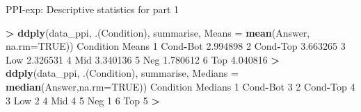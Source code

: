 \documentclass[ignorenonframetext,]{beamer}
\newenvironment{Shaded}{\begin{snugshade}}{\end{snugshade}}
\newcommand{\KeywordTok}[1]{\textcolor[rgb]{0.13,0.29,0.53}{\textbf{#1}}}
\newcommand{\DataTypeTok}[1]{\textcolor[rgb]{0.13,0.29,0.53}{#1}}
\newcommand{\DecValTok}[1]{\textcolor[rgb]{0.00,0.00,0.81}{#1}}
\newcommand{\FloatTok}[1]{\textcolor[rgb]{0.00,0.00,0.81}{#1}}
\newcommand{\StringTok}[1]{\textcolor[rgb]{0.31,0.60,0.02}{#1}}
\newcommand{\OtherTok}[1]{\textcolor[rgb]{0.56,0.35,0.01}{#1}}
\newcommand{\OperatorTok}[1]{\textcolor[rgb]{0.81,0.36,0.00}{\textbf{#1}}}
\newcommand{\NormalTok}[1]{#1}
\begin{document}
\begin{frame}[fragile]{PPI-exp: Descriptive statistics for part 1}

\tiny 

\begin{Shaded}
\begin{Highlighting}[]
\OperatorTok{>}\StringTok{ }\KeywordTok{ddply}\NormalTok{(data_ppi, .(Condition), summarise, }\DataTypeTok{Means =} \KeywordTok{mean}\NormalTok{(Answer, }\DataTypeTok{na.rm=}\OtherTok{TRUE}\NormalTok{))}
\NormalTok{  Condition    Means}
\DecValTok{1}\NormalTok{  Cond}\OperatorTok{-}\NormalTok{Bot }\FloatTok{2.994898}
\DecValTok{2}\NormalTok{  Cond}\OperatorTok{-}\NormalTok{Top }\FloatTok{3.663265}
\DecValTok{3}\NormalTok{       Low }\FloatTok{2.326531}
\DecValTok{4}\NormalTok{       Mid }\FloatTok{3.340136}
\DecValTok{5}\NormalTok{       Neg }\FloatTok{1.780612}
\DecValTok{6}\NormalTok{       Top }\FloatTok{4.040816}
\OperatorTok{>}\StringTok{ }\KeywordTok{ddply}\NormalTok{(data_ppi, .(Condition), summarise, }\DataTypeTok{Medians =} \KeywordTok{median}\NormalTok{(Answer,}\DataTypeTok{na.rm=}\OtherTok{TRUE}\NormalTok{))}
\NormalTok{  Condition Medians}
\DecValTok{1}\NormalTok{  Cond}\OperatorTok{-}\NormalTok{Bot       }\DecValTok{3}
\DecValTok{2}\NormalTok{  Cond}\OperatorTok{-}\NormalTok{Top       }\DecValTok{4}
\DecValTok{3}\NormalTok{       Low       }\DecValTok{2}
\DecValTok{4}\NormalTok{       Mid       }\DecValTok{4}
\DecValTok{5}\NormalTok{       Neg       }\DecValTok{1}
\DecValTok{6}\NormalTok{       Top       }\DecValTok{5}
\OperatorTok{>}\StringTok{ }
\end{Highlighting}
\end{Shaded}

\end{frame}
\end{document}

